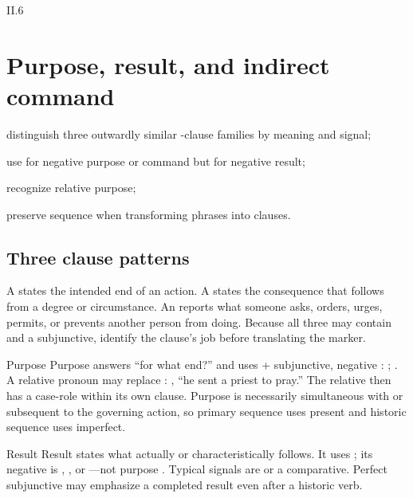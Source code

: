 \begin{courseunit}{II.6}
\chapter{Purpose, result, and indirect command}

\begin{learningobjectives}
  \item distinguish three outwardly similar -clause families by meaning and signal;
  \item use  for negative purpose or command but  for negative result;
  \item recognize relative purpose;
  \item preserve sequence when transforming phrases into clauses.
\end{learningobjectives}

\section{Three clause patterns}

A  states the intended end of an action. A  states the consequence that follows from a degree or circumstance. An
 reports what someone asks, orders, urges, permits, or
prevents another person from doing. Because all three may contain 
and a subjunctive, identify the clause's job before translating the marker.

\begin{grammarbox}{Purpose}
Purpose answers ``for what end?'' and uses  + subjunctive, negative :
; .  A relative pronoun may replace
: , ``he sent a priest to pray.''  The relative
then has a case-role within its own clause.  Purpose is necessarily simultaneous with or
subsequent to the governing action, so primary sequence uses present and historic sequence
uses imperfect.
\end{grammarbox}

\begin{grammarbox}{Result}
Result states what actually or characteristically follows.  It uses ; its negative
is , , or ---not purpose .  Typical
signals are  or a comparative.  Perfect
subjunctive may emphasize a completed result even after a historic verb.
\end{grammarbox}


\end{courseunit}
